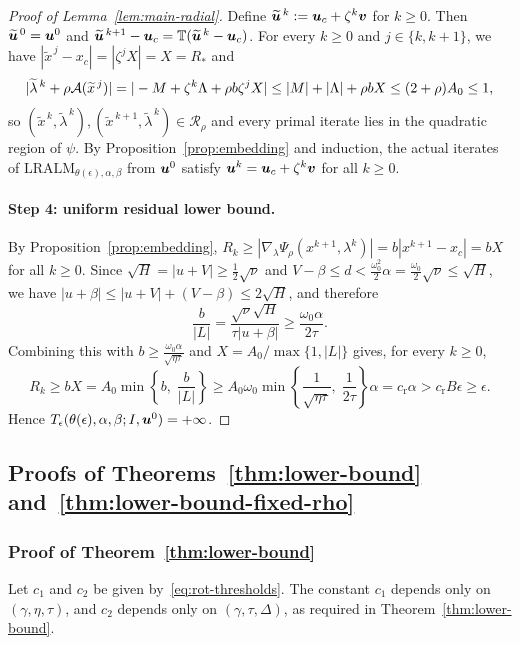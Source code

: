 \begin{proof}[Proof of Lemma~\ref{lem:main-radial}]
Define \(\widetilde{\bm{u}}^{\,k}:=\bm{u}_c+\zeta^k\bm{v}\) for \(k\ge0\). Then
\(\widetilde{\bm{u}}^{\,0}=\bm{u}^0\) and
\(\widetilde{\bm{u}}^{\,k+1}-\bm{u}_c=\mathbb T(\widetilde{\bm{u}}^{\,k}-\bm{u}_c)\).
For every \(k\ge0\) and \(j\in\{k,k+1\}\), we have
\(|\widetilde x^{\,j}-x_c|=|\zeta^j X|=X=R_*\) and
\[
|\widetilde\lambda^{\,k}+\rho\mathcal{A}(\widetilde x^{\,j})|
=|-M+\zeta^k\Lambda+\rho b\zeta^j X|
\le|M|+|\Lambda|+\rho bX
\le(2+\rho)A_0\le1,
\]
so \((\widetilde x^{\,k},\widetilde\lambda^{\,k}),(\widetilde x^{\,k+1},\widetilde\lambda^{\,k})\in\mathcal R_\rho\)
and every primal iterate lies in the quadratic region of \(\psi\). By
Proposition~\ref{prop:embedding} and induction, the actual iterates of
\(\mathrm{LRALM}_{\theta(\epsilon),\alpha,\beta}\) from \(\bm{u}^0\) satisfy
\(\bm{u}^k=\bm{u}_c+\zeta^k\bm{v}\) for all \(k\ge0\).

\paragraph{Step 4: uniform residual lower bound.}
By Proposition~\ref{prop:embedding},
\(R_k\ge|\nabla_\lambda\Psi_\rho(x^{k+1},\lambda^k)|=b|x^{k+1}-x_c|=bX\)
for all \(k\ge0\). Since \(\sqrt H=|u+V|\ge\frac12\sqrt\nu\) and
\(V-\beta\le d<\frac{\omega_0^2}{2}\alpha=\frac{\omega_0}{2}\sqrt\nu\le\sqrt H\),
we have \(|u+\beta|\le|u+V|+(V-\beta)\le2\sqrt H\), and therefore
\[
\frac{b}{|L|}=\frac{\sqrt\nu\sqrt H}{\tau|u+\beta|}\ge\frac{\omega_0\alpha}{2\tau}.
\]
Combining this with \(b\ge\frac{\omega_0\alpha}{\sqrt{\eta\tau}}\) and
\(X=A_0/\max\{1,|L|\}\) gives, for every \(k\ge0\),
\[
R_k\ge bX=A_0\min\left\{b,\;\frac{b}{|L|}\right\}
\ge A_0\omega_0\min\left\{\frac{1}{\sqrt{\eta\tau}},\;\frac{1}{2\tau}\right\}\alpha
=c_\mathrm{r}\alpha>c_\mathrm{r}B\epsilon\ge\epsilon.
\]
Hence \(T_\epsilon(\theta(\epsilon),\alpha,\beta;I,\bm{u}^0)=+\infty\).
\end{proof}

\subsection{Proofs of Theorems~\ref{thm:lower-bound} and~\ref{thm:lower-bound-fixed-rho}}
\label{app:lb-combine-all}

\subsubsection{Proof of Theorem~\ref{thm:lower-bound}}
\label{subsec:lb-combine}

Let \(c_1\) and \(c_2\) be given by~\eqref{eq:rot-thresholds}. The constant
\(c_1\) depends only on \((\gamma,\eta,\tau)\), and \(c_2\) depends only on
\((\gamma,\tau,\Delta)\), as required in Theorem~\ref{thm:lower-bound}.

